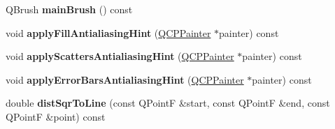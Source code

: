 \begin{DoxyCompactItemize}
\item 
Q\+Brush {\bfseries main\+Brush} () const \hypertarget{class_q_c_p_abstract_plottable_ae74c123832da180c17e22203e748d9b7}{}\label{class_q_c_p_abstract_plottable_ae74c123832da180c17e22203e748d9b7}

\item 
void {\bfseries apply\+Fill\+Antialiasing\+Hint} (\hyperlink{class_q_c_p_painter}{Q\+C\+P\+Painter} $\ast$painter) const \hypertarget{class_q_c_p_abstract_plottable_ac08a480155895e674dbfe5a5670e0ff3}{}\label{class_q_c_p_abstract_plottable_ac08a480155895e674dbfe5a5670e0ff3}

\item 
void {\bfseries apply\+Scatters\+Antialiasing\+Hint} (\hyperlink{class_q_c_p_painter}{Q\+C\+P\+Painter} $\ast$painter) const \hypertarget{class_q_c_p_abstract_plottable_a753272ee225a62827e90c3e1e78de4b1}{}\label{class_q_c_p_abstract_plottable_a753272ee225a62827e90c3e1e78de4b1}

\item 
void {\bfseries apply\+Error\+Bars\+Antialiasing\+Hint} (\hyperlink{class_q_c_p_painter}{Q\+C\+P\+Painter} $\ast$painter) const \hypertarget{class_q_c_p_abstract_plottable_af687bfe6160255960558eb71f1f81e73}{}\label{class_q_c_p_abstract_plottable_af687bfe6160255960558eb71f1f81e73}

\item 
double {\bfseries dist\+Sqr\+To\+Line} (const Q\+PointF \&start, const Q\+PointF \&end, const Q\+PointF \&point) const \hypertarget{class_q_c_p_abstract_plottable_a5ea1cab44ca912dcdc96ed81ec5bed5d}{}\label{class_q_c_p_abstract_plottable_a5ea1cab44ca912dcdc96ed81ec5bed5d}

\end{DoxyCompactItemize}
